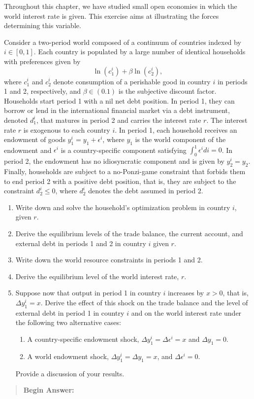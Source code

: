 \begin{exercise}
Throughout this chapter, we have studied small open economies in which the world interest rate is given. This exercise aims at illustrating the forces determining this variable. 

Consider a two-period world composed of a continuum of countries indexed by $i\in[0,1]$.  
Each country is populated by a large number of identical households with preferences given by
\[
\ln(c^i_1) + \beta \ln(c^i_2),
\]
where $c^i_1$ and $c^i_2$ denote  consumption
of a perishable good in country $i$ 
 in periods 1 and 2, respectively, and $\beta\in(0.1)$ is the subjective discount factor.  Households start period 1 with a nil net debt position. In period 1, they can borrow or lend in the international
financial market via a debt instrument, denoted $d^i_1$,  that matures  in period 2 and carries  the  interest rate $r$. 
 The interest rate $r$ is  exogenous to each country $i$. %
In period 1, 
each household receives an endowment of goods $y^i_1=y_1+\epsilon^i$, where $y_1$ is the world component of the endowment and $\epsilon^i$ is a country-specific component satisfying $\int_0^1\epsilon^idi=0$. In period 2, the endowment
has no idiosyncratic component and 
 is given by $y^i_2=y_2$. 
Finally, households are subject to a no-Ponzi-game constraint 
that forbids them to end period 2 with a positive debt position, that is, they are subject to the constraint  $d^i_2\le0$, where $d^i_2$ denotes the debt assumed in period 2. 

\begin{enumerate}
\item Write down and solve the household's optimization problem in country $i$, given $r$.   
\item Derive the  equilibrium levels of the trade balance, the current account, and external debt in periods 1 and 2 in country $i$ given $r$. 
\item Write down the world resource constraints in periods 1 and 2.
\item Derive the equilibrium level of the world interest rate, $r$. 
\item Suppose now that output in period 1 in country $i$ increases by $x>0$, that is, $\Delta y^i_1=x$. Derive the effect of this shock on the trade balance and the level of external debt in period 1 in country $i$ and on the world interest rate under the   following two alternative cases: 
\begin{enumerate}
\item A country-specific endowment shock, $\Delta y^i_1=\Delta \epsilon^i=x$ and $\Delta y_1=0$.  
\item A world endowment shock, $\Delta y^i_1 = \Delta y_1 = x$, and $\Delta \epsilon^i=0$. 
\end{enumerate}
Provide a discussion of your results. 
\end{enumerate}  
\begin{quote}
{\bf Begin Answer:}


\end{quote}
\end{exercise}
